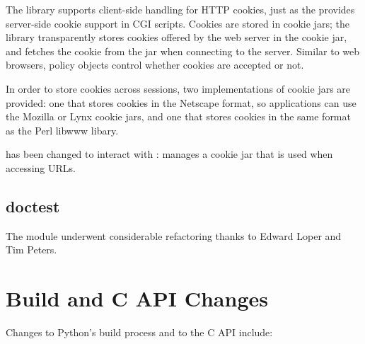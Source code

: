 \documentclass{howto}
\begin{document}
The  library supports client-side handling for HTTP
cookies, just as the  provides server-side cookie
support in CGI scripts. Cookies are stored in cookie jars; the library
transparently stores cookies offered by the web server in the cookie
jar, and fetches the cookie from the jar when connecting to the
server. Similar to web browsers, policy objects control whether
cookies are accepted or not.

In order to store cookies across sessions, two implementations of
cookie jars are provided: one that stores cookies in the Netscape
format, so applications can use the Mozilla or Lynx cookie jars, and
one that stores cookies in the same format as the Perl libwww libary.

 has been changed to interact with :
 manages a cookie jar that is used when
accessing URLs.

\subsection{doctest}

The  module underwent considerable refactoring thanks
to Edward Loper and Tim Peters.


\section{Build and C API Changes}

Changes to Python's build process and to the C API include:
\end{document}
